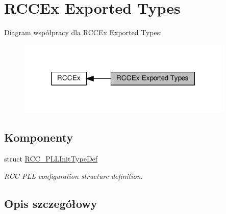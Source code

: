 \hypertarget{group___r_c_c_ex___exported___types}{}\section{R\+C\+C\+Ex Exported Types}
\label{group___r_c_c_ex___exported___types}
Diagram współpracy dla R\+C\+C\+Ex Exported Types\+:\nopagebreak
\begin{figure}[H]
\begin{center}
\leavevmode
\includegraphics[width=290pt]{group___r_c_c_ex___exported___types}
\end{center}
\end{figure}
\subsection*{Komponenty}
\begin{DoxyCompactItemize}
\item 
struct \hyperlink{struct_r_c_c___p_l_l_init_type_def}{R\+C\+C\+\_\+\+P\+L\+L\+Init\+Type\+Def}
\begin{DoxyCompactList}\small\item\em R\+CC P\+LL configuration structure definition. \end{DoxyCompactList}\end{DoxyCompactItemize}


\subsection{Opis szczegółowy}
